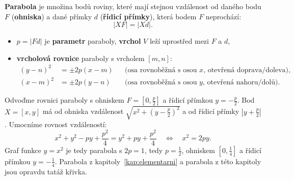 \begin{definitionbox}
  \textbf{Parabola} je množina bodů roviny, které mají stejnou vzdálenost od daného bodu $F$ (\textbf{ohniska}) a dané přímky $d$ (\textbf{řídicí přímky}), která bodem $F$ neprochází:
  \begin{equation*}
    |XF| = |Xd|.
  \end{equation*}
  \begin{itemize}
    \item $p = |Fd|$ je \textbf{parametr} paraboly, \textbf{vrchol} $V$ leží uprostřed mezi $F$ a $d$,
    \item \textbf{vrcholová rovnice} paraboly s vrcholem $[m, n]$:
    \begin{align*}
      {(y - n)}^2 &= \pm 2p(x - m) &&\text{(osa rovnoběžná s osou } x\text{, otevřená doprava/doleva)},\\
      {(x - m)}^2 &= \pm 2p(y - n) &&\text{(osa rovnoběžná s osou } y\text{, otevřená nahoru/dolů)}.
    \end{align*}
  \end{itemize}
\end{definitionbox}

\begin{example}
  Odvoďme rovnici paraboly s ohniskem $F = \left[0, \frac{p}{2}\right]$ a řídicí přímkou $y = -\frac{p}{2}$. Bod $X = [x, y]$ má od ohniska vzdálenost $\sqrt{x^2 + {\left(y - \frac{p}{2}\right)}^2}$ a od řídicí přímky $\left|y + \frac{p}{2}\right|$. Umocníme rovnost vzdáleností:
  \begin{equation*}
    x^2 + y^2 - py + \frac{p^2}{4} = y^2 + py + \frac{p^2}{4}\quad\Leftrightarrow\quad x^2 = 2py.
  \end{equation*}
  Graf funkce $y = x^2$ je tedy parabola s $2p = 1$, tedy $p = \frac{1}{2}$, ohniskem $\left[0, \frac{1}{4}\right]$ a řídicí přímkou $y = -\frac{1}{4}$. Parabola z kapitoly~\ref{kap:elementarni} a parabola z této kapitoly jsou opravdu tatáž křivka.
\end{example}

\begin{center}
\end{center}

